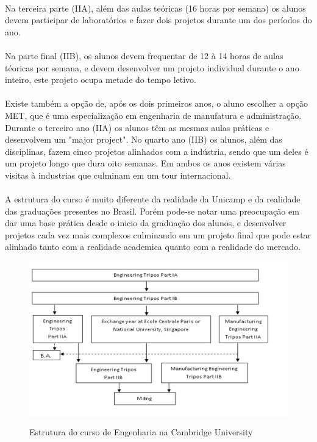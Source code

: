 \documentclass[12pt]{article} %
\begin{document}
\paragraph{} Na terceira parte (IIA), além das aulas teóricas (16 horas por semana) os alunos devem participar de laboratórios e fazer dois projetos durante um dos períodos do ano.

\paragraph{} Na parte final (IIB), os alunos devem frequentar de 12 à 14 horas de aulas téoricas por semana, e devem desenvolver um projeto individual durante o ano inteiro, este projeto ocupa metade do tempo letivo.

\paragraph{} Existe também a opção de, após os dois primeiros anos, o aluno escolher a opção MET, que é uma especialização em engenharia de manufatura e administração. Durante o terceiro ano (IIA) os alunos têm as mesmas aulas práticas e desenvolvem um "major project". No quarto ano (IIB) os alunos, além das disciplinas, fazem cinco projetos alinhados com a indústria, sendo que um deles é um projeto longo que dura oito semanas. Em ambos os anos existem várias visitas à industrias que culminam em um tour internacional.

\paragraph{} A estrutura do curso é muito diferente da realidade da Unicamp e da realidade das graduações presentes no Brasil. Porém pode-se notar uma preocupação em dar uma base prática desde o inicio da graduação dos alunos, e desenvolver projetos cada vez mais complexos culminando em um projeto final que pode estar alinhado tanto com a realidade academica quanto com a realidade do mercado. 

\begin{figure}[H]
\centering
\includegraphics[scale=0.2]{pictures/gradeCambridge.png}\\
\caption{Estrutura do curso de Engenharia na Cambridge University}
\end{figure}
\end{document}
